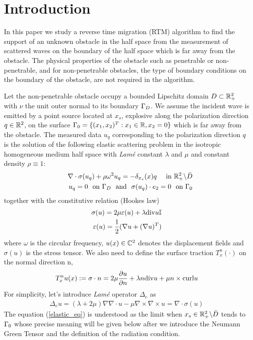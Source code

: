 \documentclass[12pt]{iopart}
\begin{document}
\newcommand{\be}{\begin{eqnarray}}
\newcommand{\ee}{\end{eqnarray}}
\newcommand{\ben}{\begin{eqnarray*}}
\newcommand{\een}{\end{eqnarray*}}
\newcommand{\nn}{\nonumber}

\section{Introduction}\label{section1}
In this paper we study a reverse time migration (RTM) algorithm to find the support of an unknown obstacle in the half space from the measurement of scattered waves on the boundary of the half space which is far away from the obstacle. The physical properties of the obstacle such as penetrable or non-penetrable, and for non-penetrable obstacles, the type of boundary conditions on the boundary of the obstacle, are not required in the algorithm.

Let the non-penetrable obstacle occupy a bounded Lipschitz domain $D\subset{\mathbb{R}}_+^2$ with $\nu$ the unit outer normal to its boundary $\Gamma_D$. We
assume the incident wave is emitted by a point source located at $x_s$, explosive along the polarization direction $q\in{\mathbb{R}}^2$, on the surface $\Gamma_0=\{(x_1,x_2)^T:x_1\in{\mathbb{R}},x_2=0\}$ which is far away from the obstacle. The measured data $u_q$ corresponding to the polarization direction $q$ is the solution of the following elastic scattering problem in the isotropic homogeneous medium half space with \emph{Lam\'{e}} constant $\lambda$ and $\mu$ and constant density $\rho\equiv1$:
\be\label{elastic_eq}
& &\nabla\cdot\sigma(u_q) + \rho\omega^2u_q= -\delta_{x_s}(x)q \ \ \ \ \mbox{in }\R_+^2\bks \bar{D}\\
& &u_q=0 \ \ \mbox{on} \ \Ga_D  \ \ \mbox{and} \ \ \sigma(u_q)\cdot e_2=0 \ \ \mbox{on} \ \Ga_0
\ee
together with the constitutive relation (Hookes law)
\ben
\sigma(u) = 2\mu\ep(u) + \lambda\div u \I \\
\ep(u)=\frac{1}{2}(\na u +(\na u)^T)
\een
where $\omega$ is the circular frequency, $u(x)\in{\mathbb{C}}^2$ denotes the displacement fields and $\sigma(u)$ is the stress tensor. We also need to define the surface traction $T_x^n (\cdot)$ on the normal direction n,
\ben
T_x^n u(x) := \sigma\cdot n = 2\mu\frac{\pa u}{\pa n}+\lambda n\div u + \mu n \times \curl u
\een
For simplicity, let's introduce \emph{Lam\'{e}} operator $\Delta_e$ as
\ben
\Delta_e u = (\lambda+2\mu)\nabla\nabla\cdot u - \mu\nabla\times\nabla\times u=\nabla\cdot\sigma(u)
\een
The equation (\ref{elastic_eq}) is understood as the limit when $x_s\in{\mathbb{R}}_+^2\backslash \bar{D}$ tends to $\Gamma_0$ whose precise meaning will be given below after we introduce the Neumann Green Tensor and the definition of the radiation condition.
\end{document}
